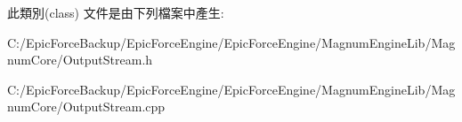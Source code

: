 此類別(class) 文件是由下列檔案中產生\+:\begin{DoxyCompactItemize}
\item 
C\+:/\+Epic\+Force\+Backup/\+Epic\+Force\+Engine/\+Epic\+Force\+Engine/\+Magnum\+Engine\+Lib/\+Magnum\+Core/Output\+Stream.\+h\item 
C\+:/\+Epic\+Force\+Backup/\+Epic\+Force\+Engine/\+Epic\+Force\+Engine/\+Magnum\+Engine\+Lib/\+Magnum\+Core/Output\+Stream.\+cpp\end{DoxyCompactItemize}
